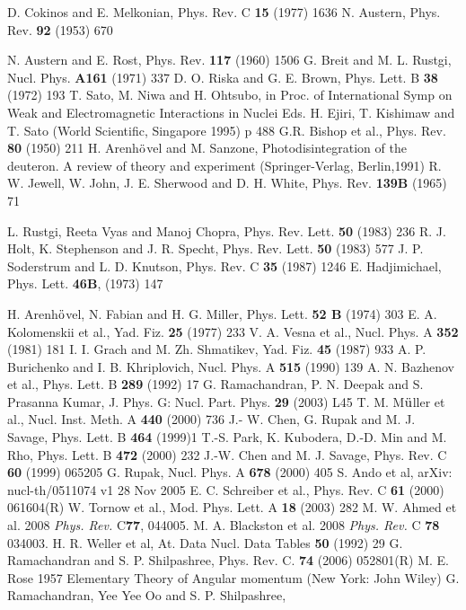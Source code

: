 \begin{thebibliography}{99}
D. Cokinos and E. Melkonian, Phys. Rev. C {\bf 15} (1977) 1636
 N. Austern, Phys. Rev. {\bf 92} (1953) 670

N. Austern and E. Rost, Phys. Rev. {\bf 117} (1960) 1506
 G. Breit and M. L. Rustgi, Nucl. Phys. {\bf A161} (1971) 337
 D. O. Riska and G. E. Brown, Phys. Lett. B {\bf 38} (1972) 193
 T. Sato, M. Niwa and H. Ohtsubo, in Proc. of International Symp on Weak and Electromagnetic Interactions in Nuclei Eds. H. Ejiri, T. Kishimaw and T. Sato (World Scientific, Singapore 1995) p 488
 G.R. Bishop et al., Phys. Rev. {\bf 80} (1950) 211
 H. Arenh$\ddot{\rm o}$vel and M. Sanzone, Photodisintegration of the deuteron. A review of theory and experiment (Springer-Verlag, Berlin,1991)
 R. W. Jewell, W. John, J. E. Sherwood and D. H. White, Phys. Rev. {\bf 139B} (1965) 71

L. Rustgi, Reeta Vyas and Manoj Chopra, Phys. Rev. Lett. {\bf 50} (1983) 236
 R. J. Holt, K. Stephenson and J. R. Specht, Phys. Rev. Lett. {\bf 50} (1983) 577
 J. P. Soderstrum and L. D. Knutson, Phys. Rev. C {\bf 35} (1987) 1246
 E. Hadjimichael, Phys. Lett. {\bf 46B}, (1973) 147

H. Arenh$\ddot{\rm o}$vel, N. Fabian and H. G. Miller, Phys. Lett. {\bf 52 B} (1974) 303
 E. A. Kolomenskii  et al., Yad. Fiz. {\bf 25} (1977) 233
 V. A. Vesna  et al., Nucl. Phys. A {\bf 352} (1981) 181
 I. I. Grach and M. Zh. Shmatikev, Yad. Fiz. {\bf 45} (1987) 933
 A. P. Burichenko and I. B. Khriplovich, Nucl. Phys. A {\bf 515} (1990) 139
 A. N. Bazhenov et al., Phys. Lett. B {\bf 289} (1992) 17
 G. Ramachandran, P. N. Deepak and S. Prasanna Kumar, J. Phys. G: Nucl. Part. Phys. {\bf 29} (2003) L45
 T. M. M$\ddot{\rm u}$ller et al., Nucl. Inst. Meth. A {\bf 440} (2000) 736
 J.- W. Chen, G. Rupak and M. J. Savage, Phys. Lett. B {\bf 464} (1999)1
 T.-S. Park, K. Kubodera, D.-D. Min and M. Rho, Phys. Lett. B {\bf 472} (2000) 232
 J.-W. Chen and M. J. Savage, Phys. Rev. C {\bf 60} (1999) 065205
 G. Rupak, Nucl. Phys. A {\bf 678} (2000) 405
 S. Ando et al, arXiv: nucl-th/0511074 v1 28 Nov 2005 
E. C. Schreiber  et al., Phys. Rev. C {\bf 61} (2000) 061604(R)
 W. Tornow  et al., Mod. Phys. Lett. A {\bf 18} (2003) 282
 M. W. Ahmed et al. 2008 {\it Phys. Rev.} C{\bf 77}, 044005.
 M. A. Blackston et al. 2008 {\it Phys. Rev.} C {\bf 78} 034003.
 H. R. Weller  et al,  At. Data Nucl. Data Tables {\bf 50} (1992) 29
 G. Ramachandran and S. P. Shilpashree, Phys. Rev. C. {\bf 74} (2006) 052801(R)
 M. E. Rose 1957 Elementary Theory of Angular momentum (New York: John Wiley)
 G. Ramachandran, Yee Yee Oo and S. P. Shilpashree,


\end{thebibliography}
